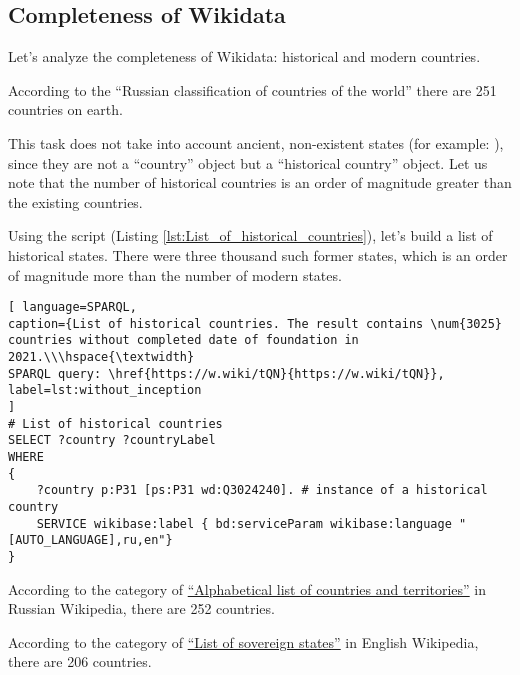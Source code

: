 \subsection{Completeness of Wikidata}

Let's analyze the completeness of Wikidata: historical and modern countries.

According to the ``Russian classification of countries of the world'' there are 251 countries on earth.

This task does not take into account ancient, non-existent states (for example: ), since they are not a ``country'' object but a ``historical country'' object. Let us note that the number of historical countries is an order of magnitude greater than the existing countries.


Using the script (Listing \ref{lst:List_of_historical_countries}), let's build a list of historical states. There were three thousand such former states, which is an order of magnitude more than the number of modern states.

\begin{lstlisting}[ language=SPARQL, 
caption={List of historical countries. The result contains \num{3025} countries without completed date of foundation in 2021.\\\hspace{\textwidth}
SPARQL query: \href{https://w.wiki/tQN}{https://w.wiki/tQN}},
label=lst:without_inception
]
# List of historical countries
SELECT ?country ?countryLabel
WHERE
{
	?country p:P31 [ps:P31 wd:Q3024240]. # instance of a historical country 
	SERVICE wikibase:label { bd:serviceParam wikibase:language "[AUTO_LANGUAGE],ru,en"} 
}
\end{lstlisting}



According to the category of \href{https://w.wiki/dWv}{``Alphabetical list of countries and territories''} in Russian Wikipedia, there are 252 countries.

According to the category of \href{https://en.wikipedia.org/wiki/List_of_sovereign_states}{``List of sovereign states''} in English Wikipedia, there are 206 countries.

